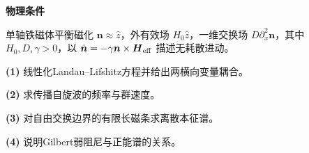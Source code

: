 \textbf{物理条件}\par 单轴铁磁体平衡磁化 \(\boldsymbol n\approx\hat z\)，外有效场 \(H_0\hat z\)，一维交换场 \(D\partial_x^2\boldsymbol n\)，其中 \(H_0,D,\gamma>0\)，以 \(\dot{\boldsymbol n}=-\gamma\boldsymbol n\times\boldsymbol H_{\rm eff}\) 描述无耗散进动。
\par\noindent\textbf{(1)} 线性化Landau–Lifshitz方程并给出两横向变量耦合。
\par\noindent\textbf{(2)} 求传播自旋波的频率与群速度。
\par\noindent\textbf{(3)} 对自由交换边界的有限长磁条求离散本征谱。
\par\noindent\textbf{(4)} 说明Gilbert弱阻尼与正能谱的关系。
